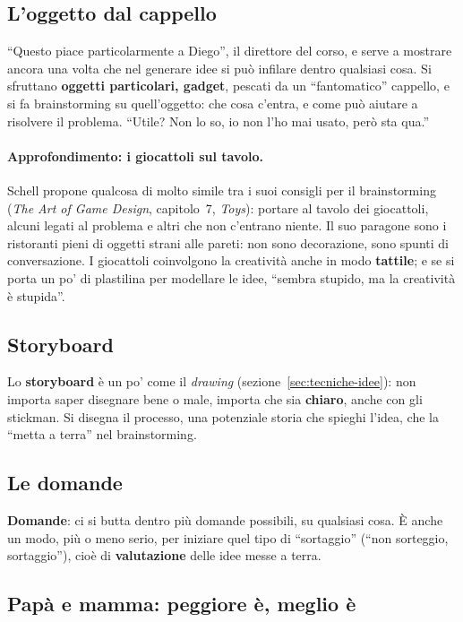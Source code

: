 \subsection{L'oggetto dal cappello}

``Questo piace particolarmente a Diego'', il direttore del corso, e serve a
mostrare ancora una volta che nel generare idee si può infilare dentro
qualsiasi cosa. Si sfruttano \textbf{oggetti particolari, gadget}, pescati da
un ``fantomatico'' cappello, e si fa brainstorming su quell'oggetto: che cosa
c'entra, e come può aiutare a risolvere il problema. ``Utile? Non lo so, io
non l'ho mai usato, però sta qua.''

\paragraph{Approfondimento: i giocattoli sul tavolo.} Schell propone qualcosa
di molto simile tra i suoi consigli per il brainstorming
(\emph{The Art of Game Design}, capitolo~7, \emph{Toys}): portare al tavolo
dei giocattoli, alcuni legati al problema e altri che non c'entrano niente.
Il suo paragone sono i ristoranti pieni di oggetti strani alle pareti: non
sono decorazione, sono spunti di conversazione. I giocattoli coinvolgono la
creatività anche in modo \textbf{tattile}; e se si porta un po' di
plastilina per modellare le idee, ``sembra stupido, ma la creatività è
stupida''.

\subsection{Storyboard}

Lo \textbf{storyboard} è un po' come il \emph{drawing}
(sezione~\ref{sec:tecniche-idee}): non importa saper disegnare bene o male,
importa che sia \textbf{chiaro}, anche con gli stickman. Si disegna il
processo, una potenziale storia che spieghi l'idea, che la ``metta a terra''
nel brainstorming.

\subsection{Le domande}

\textbf{Domande}: ci si butta dentro più domande possibili, su qualsiasi
cosa. È anche un modo, più o meno serio, per iniziare quel tipo di
``sortaggio'' (``non sorteggio, sortaggio''), cioè di \textbf{valutazione}
delle idee messe a terra.

\subsection{Papà e mamma: peggiore è, meglio è}

